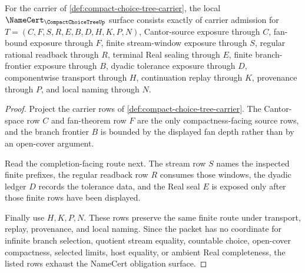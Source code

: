 \begin{theorem}
\label{thm:compact-choice-tree-namecert-obligations}
For the carrier of \autoref{def:compact-choice-tree-carrier}, the local $\NameCert_{\CompactChoiceTreeUp}$ surface consists exactly of carrier admission for $T=(C,F,S,R,E,B,D,H,K,P,N)$, Cantor-source exposure through $C$, fan-bound exposure through $F$, finite stream-window exposure through $S$, regular rational readback through $R$, terminal Real sealing through $E$, finite branch-frontier exposure through $B$, dyadic tolerance exposure through $D$, componentwise transport through $H$, continuation replay through $K$, provenance through $P$, and local naming through $N$.
\end{theorem}
\begin{proof}
Project the carrier rows of \autoref{def:compact-choice-tree-carrier}. The Cantor-space row $C$ and fan-theorem row $F$ are the only compactness-facing source rows, and the branch frontier $B$ is bounded by the displayed fan depth rather than by an open-cover argument.

Read the completion-facing route next. The stream row $S$ names the inspected finite prefixes, the regular readback row $R$ consumes those windows, the dyadic ledger $D$ records the tolerance data, and the Real seal $E$ is exposed only after those finite rows have been displayed.

Finally use $H,K,P,N$. These rows preserve the same finite route under transport, replay, provenance, and local naming. Since the packet has no coordinate for infinite branch selection, quotient stream equality, countable choice, open-cover compactness, selected limits, host equality, or ambient Real completeness, the listed rows exhaust the NameCert obligation surface.
\end{proof}

